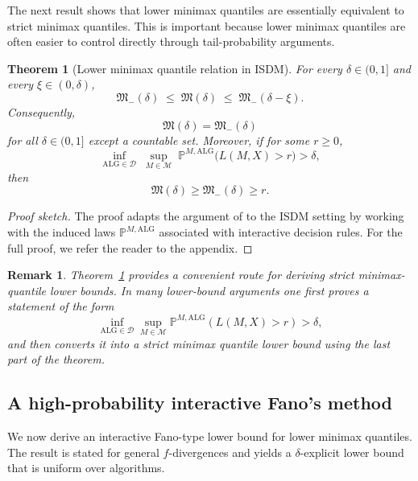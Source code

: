 \documentclass[journal]{IEEEtran}
\newtheorem{theorem}{Theorem}
\newtheorem{remark}{Remark}
\newcommand{\ALG}{\mathrm{ALG}}
\begin{document}
The next result shows that lower minimax quantiles are essentially equivalent to strict minimax quantiles. This is important because lower minimax quantiles are often easier to control directly through tail-probability arguments.

\begin{theorem}[Lower minimax quantile relation in ISDM]
\label{thm:lower-minimax-quantile-relation}
For every \(\delta\in(0,1]\) and every \(\xi\in(0,\delta)\),
\[
\mathfrak M_{-}(\delta)
\;\le\;
\mathfrak M(\delta)
\;\le\;
\mathfrak M_{-}(\delta-\xi).
\]
Consequently,
\[
\mathfrak M(\delta)=\mathfrak M_{-}(\delta)
\]
for all \(\delta\in(0,1]\) except a countable set. Moreover, if for some \(r\ge 0\),
\[
\inf_{\ALG\in\mathcal D}\;
\sup_{M\in\mathcal M}\;
\mathbb P^{M,\ALG}\bigl(L(M,X)>r\bigr)
>
\delta,
\]
then
\[
\mathfrak M(\delta)\ge \mathfrak M_{-}(\delta)\ge r.
\]
\end{theorem}

\begin{proof}[Proof sketch] The proof adapts the argument of \cite[Theorem 4]{ma2024high} to the ISDM
setting by working with the induced laws \(\mathbb{P}^{M,\ALG}\) associated with
interactive decision rules. For the full proof, we refer the reader to the appendix.
\end{proof}

\begin{remark}
    Theorem~\ref{thm:lower-minimax-quantile-relation} provides a convenient
route for deriving strict minimax-quantile lower bounds. In many lower-bound arguments one first proves a statement of the form
\[
\inf_{\ALG\in\mathcal D}\sup_{M\in\mathcal M}\mathbb P^{M,\ALG}(L(M,X)>r)>\delta,
\]
and then converts it into a strict minimax quantile lower bound using the last part of the theorem.
\end{remark}


\subsection{A high-probability interactive Fano's method}

We now derive an interactive Fano-type lower bound for lower minimax quantiles. The result is stated for general \(f\)-divergences and yields a \(\delta\)-explicit lower bound that is uniform over algorithms.
\end{document}
